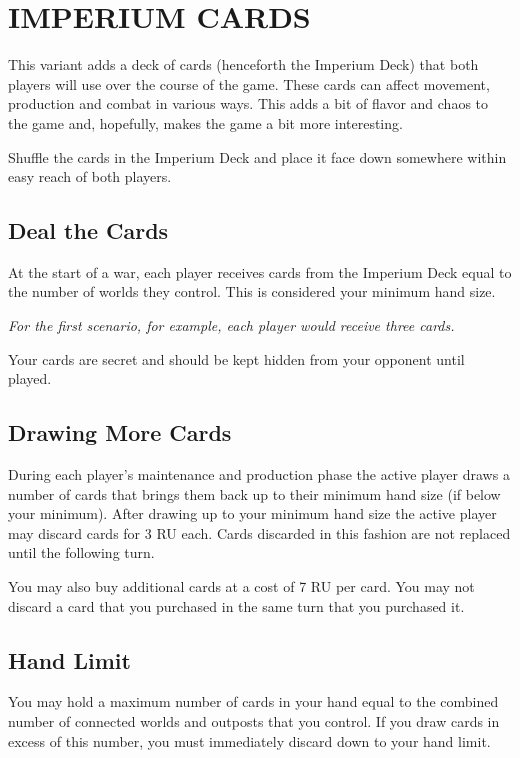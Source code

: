 \section{IMPERIUM CARDS}
\hfill

This variant adds a deck of cards (henceforth the Imperium Deck) that both players will use over the course of the game. These cards can affect movement, production and combat in various ways. This adds a bit of flavor and chaos to the game and, hopefully, makes the game a bit more interesting.

Shuffle the cards in the Imperium Deck and place it face down somewhere within easy reach of both players.

\subsection{Deal the Cards}

At the start of a war, each player receives cards from the Imperium Deck equal to the number of worlds they control. This is considered your minimum hand size.

\textit{For the first scenario, for example, each player would receive three cards.}

Your cards are secret and should be kept hidden from your opponent until played.

\subsection{Drawing More Cards}

During each player's maintenance and production phase the active player draws a number of cards that brings them back up to their minimum hand size (if below your minimum). After drawing up to your minimum hand size the active player may discard cards for 3 RU each. Cards discarded in this fashion are not replaced until the following turn.

You may also buy additional cards at a cost of 7 RU per card. You may not discard a card that you purchased in the same turn that you purchased it.

\subsection{Hand Limit}

You may hold a maximum number of cards in your hand equal to the combined number of connected worlds and outposts that you control. If you draw cards in excess of this number, you must immediately discard down to your hand limit.

